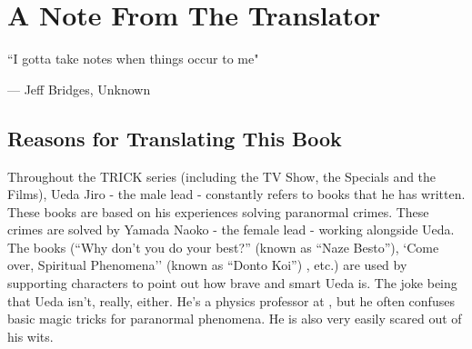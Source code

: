 

\setcounter{footnote}{0}
\setcounter{endnote}{0}

\chapter*{A Note From The Translator}

\epigraph{``I gotta take notes when things occur to me"}{--- \textup{Jeff Bridges}, Unknown}

\section*{Reasons for Translating This Book}

Throughout the TRICK series (including the TV Show, the Specials and the Films), Ueda Jiro - the male lead - constantly refers to books that he has written. These books are based on his experiences solving paranormal crimes. These crimes are solved by Yamada Naoko - the female lead - working alongside Ueda. The books (``Why don't you do your best?'' (known as ``Naze Besto''), `Come over, Spiritual Phenomena'' (known as ``Donto Koi'') , etc.) are used by supporting characters to point out how brave and smart Ueda is. The joke being that Ueda isn't, really, either. He's a physics professor at , but he often confuses basic magic tricks for paranormal phenomena. He is also very easily scared out of his wits.

